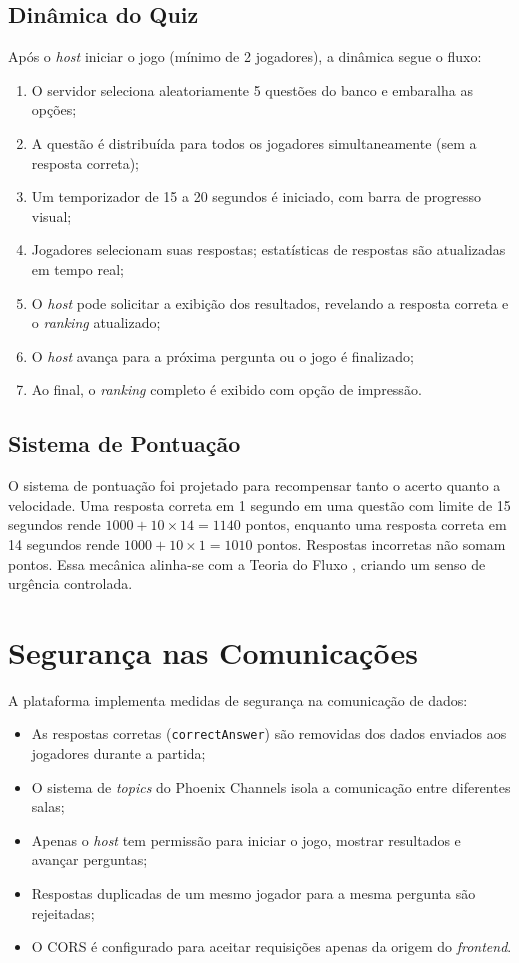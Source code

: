 \documentclass[
	12pt,
	openany,
	oneside,
	a4paper,
	english,
	brazil
]{abntex2}
\begin{document}
\subsection{Dinâmica do Quiz}

Após o \textit{host} iniciar o jogo (mínimo de 2 jogadores), a dinâmica segue o fluxo:

\begin{enumerate}
  \item O servidor seleciona aleatoriamente 5 questões do banco e embaralha as opções;
  \item A questão é distribuída para todos os jogadores simultaneamente (sem a resposta correta);
  \item Um temporizador de 15 a 20 segundos é iniciado, com barra de progresso visual;
  \item Jogadores selecionam suas respostas; estatísticas de respostas são atualizadas em tempo real;
  \item O \textit{host} pode solicitar a exibição dos resultados, revelando a resposta correta e o \textit{ranking} atualizado;
  \item O \textit{host} avança para a próxima pergunta ou o jogo é finalizado;
  \item Ao final, o \textit{ranking} completo é exibido com opção de impressão.
\end{enumerate}

\subsection{Sistema de Pontuação}

O sistema de pontuação foi projetado para recompensar tanto o acerto quanto a velocidade. Uma resposta correta em 1 segundo em uma questão com limite de 15 segundos rende $1000 + 10 \times 14 = 1140$ pontos, enquanto uma resposta correta em 14 segundos rende $1000 + 10 \times 1 = 1010$ pontos. Respostas incorretas não somam pontos. Essa mecânica alinha-se com a Teoria do Fluxo \cite{csikszentmihalyi1990}, criando um senso de urgência controlada.

\section{Segurança nas Comunicações}

A plataforma implementa medidas de segurança na comunicação de dados:

\begin{itemize}
  \item As respostas corretas (\texttt{correctAnswer}) são removidas dos dados enviados aos jogadores durante a partida;
  \item O sistema de \textit{topics} do Phoenix Channels isola a comunicação entre diferentes salas;
  \item Apenas o \textit{host} tem permissão para iniciar o jogo, mostrar resultados e avançar perguntas;
  \item Respostas duplicadas de um mesmo jogador para a mesma pergunta são rejeitadas;
  \item O CORS é configurado para aceitar requisições apenas da origem do \textit{frontend}.
\end{itemize}
\end{document}
